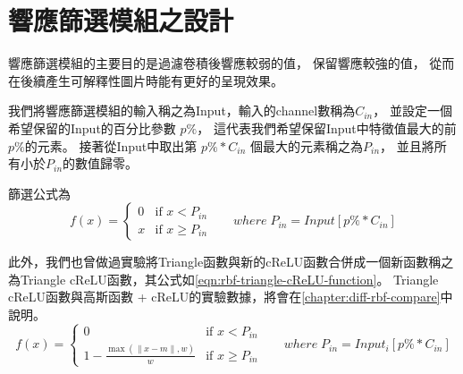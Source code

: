 \documentclass[class=NCU_thesis, crop=false]{standalone}
\begin{document}
\section{響應篩選模組之設計}
	

	
	響應篩選模組的主要目的是過濾卷積後響應較弱的值，
	保留響應較強的值，
	從而在後續產生可解釋性圖片時能有更好的呈現效果。

	我們將響應篩選模組的輸入稱之為Input，輸入的channel數稱為$C_{in}$，
	並設定一個希望保留的Input的百分比參數 $p\%$，
	這代表我們希望保留Input中特徵值最大的前$p\%$的元素。
	接著從Input中取出第 $p\% * C_{in}$  個最大的元素稱之為$P_{in}$，
	並且將所有小於$P_{in}$的數值歸零。
	
	篩選公式為\\
	\begin{equation}
	    \label{eq:eq-cReLUPercent}
	    f(x)= 
	    \begin{cases}
	        0 & \text{if  $x < P_{in}$ }\\
	        x & \text{if  $x \geq P_{in}$}
	    \end{cases} \quad where \; P_{in} = Input\left[ p\% * C_{in} \right]
	\end{equation}

	此外，我們也曾做過實驗將Triangle函數與新的cReLU函數合併成一個新函數稱之為Triangle cReLU函數，其公式如\cref{eqn:rbf-triangle-cReLU-function}。
	Triangle cReLU函數與高斯函數 + cReLU的實驗數據，將會在\cref{chapter:diff-rbf-compare}中說明。
	\begin{equation}
      \label{eqn:rbf-triangle-cReLU-function}
      f(x)= 
      \begin{cases}
	        0 & \text{if  $x < P_{in}$ }\\
	        1 - \frac{ \max \left( \| x-m \|, w \right)}{w} & \text{if  $x \geq P_{in}$}
	   \end{cases} \quad where \; P_{in} = Input_{i}\left[ p\% * C_{in} \right]
  	\end{equation}
\pagebreak
\end{document}
